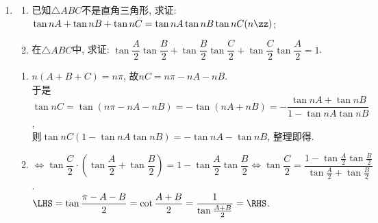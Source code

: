 \begin{enumerate}
\item
\begin{enumerate}[(1)]
\item 已知$\triangle{ABC}$不是直角三角形, 求证: $\tan{nA}+\tan{nB}+\tan{nC}=\tan{nA}\tan{nB}\tan{nC}(n\zz)$; 
\item 在$\triangle{ABC}$中, 求证: $\tan\dfrac{A}{2}\tan\dfrac{B}{2}+\tan\dfrac{B}{2}\tan\dfrac{C}{2}+\tan\dfrac{C}{2}\tan\dfrac{A}{2}=1$. 
\end{enumerate}
\begin{jieda}
\begin{enumerate}[(1)]
\item $n(A+B+C)=n\pi$, 故$nC=n\pi-nA-nB$. \\
于是$\tan{nC}=\tan(n\pi-nA-nB)=-\tan(nA+nB)=-\dfrac{\tan{nA}+\tan{nB}}{1-\tan{nA}\tan{nB}}$, \\
则$\tan{nC}(1-\tan{nA}\tan{nB})=-\tan{nA}-\tan{nB}$, 整理即得. 

\item $\iff\tan\dfrac{C}{2}\cdot\left(\tan\dfrac{A}{2}+\tan\dfrac{B}{2}\right)=1-\tan\dfrac{A}{2}\tan\dfrac{B}{2}
\iff\tan\dfrac{C}{2}=\dfrac{1-\tan\frac{A}{2}\tan\frac{B}{2}}{\tan\frac{A}{2}+\tan\frac{B}{2}}$. \\
$\LHS=\tan\dfrac{\pi-A-B}{2}=\cot\dfrac{A+B}{2}=\dfrac{1}{\tan\frac{A+B}{2}}=\RHS$. 
\end{enumerate}
\end{jieda}
\end{enumerate}
\clearpage

